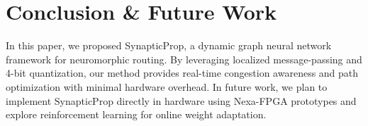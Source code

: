 \section{Conclusion \& Future Work}
\label{sec:conclusion}
In this paper, we proposed SynapticProp, a dynamic graph neural network framework for neuromorphic routing. By leveraging localized message-passing and 4-bit quantization, our method provides real-time congestion awareness and path optimization with minimal hardware overhead. In future work, we plan to implement SynapticProp directly in hardware using Nexa-FPGA prototypes and explore reinforcement learning for online weight adaptation.
